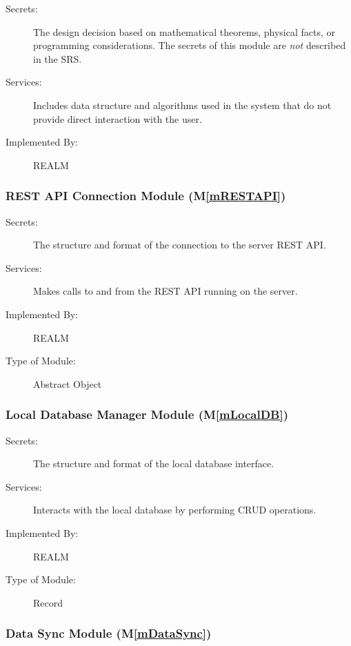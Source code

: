 \documentclass[12pt, titlepage]{article}
\newcommand{\mref}[1]{M\ref{#1}}
\begin{document}
\begin{description}
\item[Secrets:] The design decision based on mathematical theorems, physical
  facts, or programming considerations. The secrets of this module are
  \emph{not} described in the SRS.
\item[Services:] Includes data structure and algorithms used in the system that
  do not provide direct interaction with the user. 
\item[Implemented By:] REALM
\end{description}

\subsubsection{REST API Connection Module (\mref{mRESTAPI})}

\begin{description}
\item[Secrets:]The structure and format of the connection to the server REST API.
\item[Services:]Makes calls to and from the REST API running on the server.
\item[Implemented By:]REALM
\item[Type of Module:]Abstract Object
\end{description}

\subsubsection{Local Database Manager Module (\mref{mLocalDB})}

\begin{description}
\item[Secrets:]The structure and format of the local database interface.
\item[Services:]Interacts with the local database by performing CRUD operations.
\item[Implemented By:]REALM
\item[Type of Module:]Record
\end{description}

\subsubsection{Data Sync Module (\mref{mDataSync})}
\end{document}
